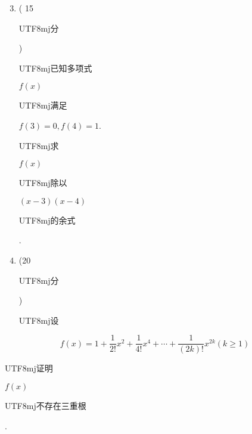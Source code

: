 \documentclass[10pt]{article}
\begin{document}
\begin{enumerate}
  \setcounter{enumi}{2}
  \item ( 15 \begin{CJK}{UTF8}{mj}分\end{CJK}) \begin{CJK}{UTF8}{mj}已知多项式\end{CJK} $f(x)$ \begin{CJK}{UTF8}{mj}满足\end{CJK} $f(3)=0, f(4)=1$. \begin{CJK}{UTF8}{mj}求\end{CJK} $f(x)$ \begin{CJK}{UTF8}{mj}除以\end{CJK} $(x-3)(x-4)$ \begin{CJK}{UTF8}{mj}的余式\end{CJK}.

  \item (20 \begin{CJK}{UTF8}{mj}分\end{CJK}) \begin{CJK}{UTF8}{mj}设\end{CJK}

\end{enumerate}
$$
f(x)=1+\frac{1}{2 !} x^{2}+\frac{1}{4 !} x^{4}+\cdots+\frac{1}{(2 k) !} x^{2 k}(k \geqslant 1)
$$
\begin{CJK}{UTF8}{mj}证明\end{CJK} $f(x)$ \begin{CJK}{UTF8}{mj}不存在三重根\end{CJK}.
\end{document}
